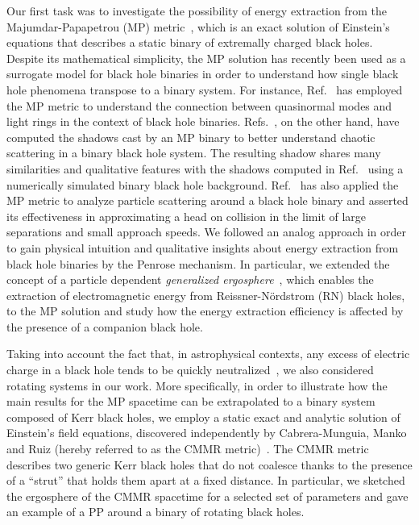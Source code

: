 Our first task was to investigate the possibility of energy extraction from the Majumdar-Papapetrou (MP) metric~\cite{MAJUMDAR1947,PAPAPETROU1947}, which is an exact solution of Einstein's equations that describes a static binary of extremally charged black holes. Despite its mathematical simplicity, the MP solution has recently been used as a surrogate model for black hole binaries in order to understand how single black hole phenomena transpose to a binary system. For instance, Ref.~\cite{ASSUMPCAO2018} has employed the MP metric to understand the connection between quasinormal modes and light rings in the context of black hole binaries. Refs.~\cite{Shipley:2016omi,Shipley:2019kfq}, on the other hand, have computed the shadows cast by an MP binary to better understand chaotic scattering in a binary black hole system. The resulting shadow shares many similarities and qualitative features with the shadows computed in Ref.~\cite{Bohn:2014xxa} using a numerically simulated binary black hole background. Ref.~\cite{BINI2019} has also applied the MP metric to analyze particle scattering around a black hole binary and asserted its effectiveness in approximating a head on collision in the limit of large separations and small approach speeds. We followed an analog approach in order to gain physical intuition and qualitative insights about energy extraction from black hole binaries by the Penrose mechanism. In particular, we extended the concept of a particle dependent \emph{generalized ergosphere}~\cite{RUFFINI1971}, which enables the extraction of electromagnetic energy from Reissner-N\"ordstrom (RN) black holes, to the MP solution and study how the energy extraction efficiency is affected by the presence of a companion black hole.

Taking into account the fact that, in astrophysical contexts, any excess of electric charge in a black hole tends to be quickly neutralized~\cite{gibbons1975}, we also considered rotating systems in our work. More specifically, in order to illustrate how the main results for the MP spacetime can be extrapolated to a binary system composed of Kerr black holes, we employ a static exact and analytic solution of Einstein's field equations, discovered independently by Cabrera-Munguia, Manko and Ruiz (hereby referred to as the CMMR metric)~\cite{cabrera_metric,manko_ruiz_metric, manko_ruiz_thermo}. The CMMR metric describes two generic Kerr black holes that do not coalesce thanks to the presence of a ``strut'' that holds them apart at a fixed distance. In particular, we sketched the ergosphere of the CMMR spacetime for a selected set of parameters and gave an example of a PP around a binary of rotating black holes.

